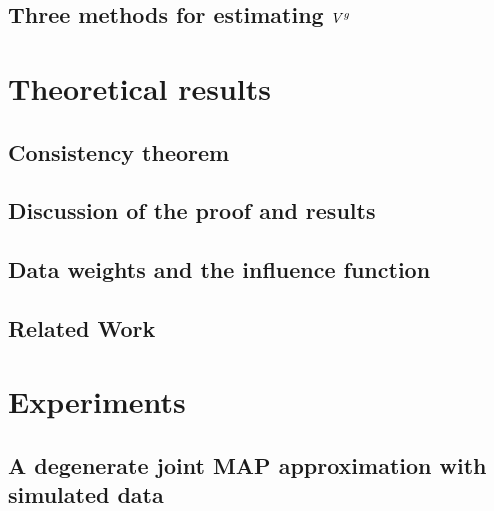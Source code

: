 \documentclass[12pt]{article} %
\begin{document}
\subsection{Three methods for estimating $V^g$}



%
\section{Theoretical results}



\subsection{Consistency theorem}


\subsection{Discussion of the proof and results}




\subsection{Data weights and the influence function}


\subsection{Related Work}



\section{Experiments}


\subsection{A degenerate joint MAP approximation with simulated data}

\end{document}
